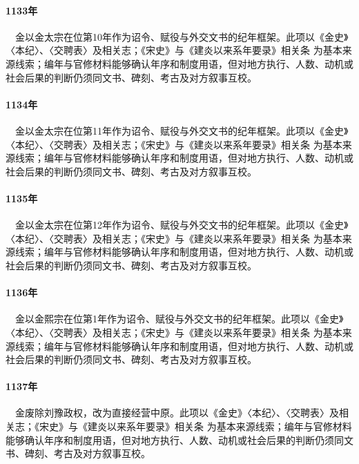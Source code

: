 \paragraph{1133年}　金以金太宗在位第10年作为诏令、赋役与外交文书的纪年框架。此项以《金史》〈本纪〉、〈交聘表〉及相关志；《宋史》与《建炎以来系年要录》相关条 为基本来源线索；编年与官修材料能够确认年序和制度用语，但对地方执行、人数、动机或社会后果的判断仍须同文书、碑刻、考古及对方叙事互校。

\paragraph{1134年}　金以金太宗在位第11年作为诏令、赋役与外交文书的纪年框架。此项以《金史》〈本纪〉、〈交聘表〉及相关志；《宋史》与《建炎以来系年要录》相关条 为基本来源线索；编年与官修材料能够确认年序和制度用语，但对地方执行、人数、动机或社会后果的判断仍须同文书、碑刻、考古及对方叙事互校。

\paragraph{1135年}　金以金太宗在位第12年作为诏令、赋役与外交文书的纪年框架。此项以《金史》〈本纪〉、〈交聘表〉及相关志；《宋史》与《建炎以来系年要录》相关条 为基本来源线索；编年与官修材料能够确认年序和制度用语，但对地方执行、人数、动机或社会后果的判断仍须同文书、碑刻、考古及对方叙事互校。

\paragraph{1136年}　金以金熙宗在位第1年作为诏令、赋役与外交文书的纪年框架。此项以《金史》〈本纪〉、〈交聘表〉及相关志；《宋史》与《建炎以来系年要录》相关条 为基本来源线索；编年与官修材料能够确认年序和制度用语，但对地方执行、人数、动机或社会后果的判断仍须同文书、碑刻、考古及对方叙事互校。

\paragraph{1137年}　金废除刘豫政权，改为直接经营中原。此项以《金史》〈本纪〉、〈交聘表〉及相关志；《宋史》与《建炎以来系年要录》相关条 为基本来源线索；编年与官修材料能够确认年序和制度用语，但对地方执行、人数、动机或社会后果的判断仍须同文书、碑刻、考古及对方叙事互校。

